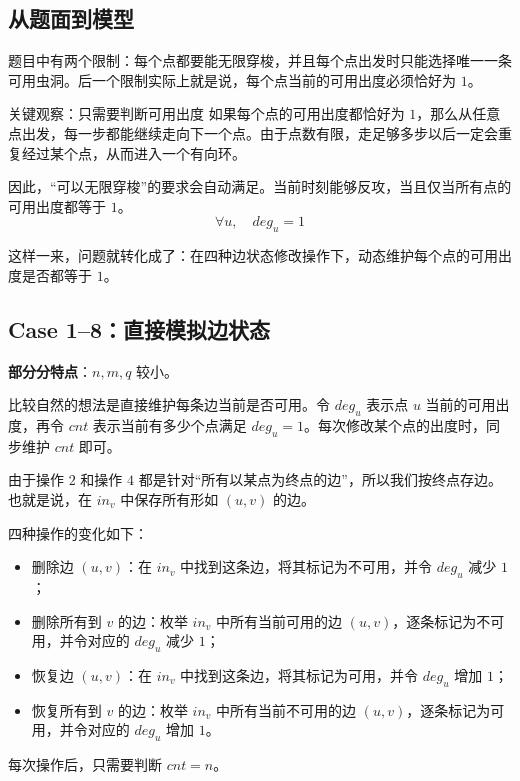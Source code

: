 \documentclass{book}
\begin{document}
\subsection{从题面到模型}

题目中有两个限制：每个点都要能无限穿梭，并且每个点出发时只能选择唯一一条可用虫洞。后一个限制实际上就是说，每个点当前的可用出度必须恰好为 $1$。

\begin{keybox}{关键观察：只需要判断可用出度}
如果每个点的可用出度都恰好为 $1$，那么从任意点出发，每一步都能继续走向下一个点。由于点数有限，走足够多步以后一定会重复经过某个点，从而进入一个有向环。

因此，“可以无限穿梭”的要求会自动满足。当前时刻能够反攻，当且仅当所有点的可用出度都等于 $1$。
\[
\forall u,\quad deg_u=1
\]
\end{keybox}

这样一来，问题就转化成了：在四种边状态修改操作下，动态维护每个点的可用出度是否都等于 $1$。

\subsection{Case 1--8：直接模拟边状态}

\textbf{部分分特点}：$n,m,q$ 较小。

比较自然的想法是直接维护每条边当前是否可用。令 $deg_u$ 表示点 $u$ 当前的可用出度，再令 $cnt$ 表示当前有多少个点满足 $deg_u=1$。每次修改某个点的出度时，同步维护 $cnt$ 即可。

由于操作 $2$ 和操作 $4$ 都是针对“所有以某点为终点的边”，所以我们按终点存边。也就是说，在 $in_v$ 中保存所有形如 $(u,v)$ 的边。

四种操作的变化如下：

\begin{itemize}[leftmargin=2em,itemsep=1pt,topsep=2pt,parsep=0pt,partopsep=0pt]
    \item 删除边 $(u,v)$：在 $in_v$ 中找到这条边，将其标记为不可用，并令 $deg_u$ 减少 $1$；
    \item 删除所有到 $v$ 的边：枚举 $in_v$ 中所有当前可用的边 $(u,v)$，逐条标记为不可用，并令对应的 $deg_u$ 减少 $1$；
    \item 恢复边 $(u,v)$：在 $in_v$ 中找到这条边，将其标记为可用，并令 $deg_u$ 增加 $1$；
    \item 恢复所有到 $v$ 的边：枚举 $in_v$ 中所有当前不可用的边 $(u,v)$，逐条标记为可用，并令对应的 $deg_u$ 增加 $1$。
\end{itemize}

每次操作后，只需要判断 $cnt=n$。
\end{document}
